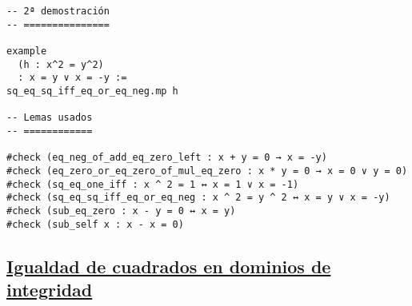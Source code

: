 \begin{verbatim}
-- 2ª demostración
-- ===============

example
  (h : x^2 = y^2)
  : x = y ∨ x = -y :=
sq_eq_sq_iff_eq_or_eq_neg.mp h

-- Lemas usados
-- ============

#check (eq_neg_of_add_eq_zero_left : x + y = 0 → x = -y)
#check (eq_zero_or_eq_zero_of_mul_eq_zero : x * y = 0 → x = 0 ∨ y = 0)
#check (sq_eq_one_iff : x ^ 2 = 1 ↔ x = 1 ∨ x = -1)
#check (sq_eq_sq_iff_eq_or_eq_neg : x ^ 2 = y ^ 2 ↔ x = y ∨ x = -y)
#check (sub_eq_zero : x - y = 0 ↔ x = y)
#check (sub_self x : x - x = 0)
\end{verbatim}

\subsection{\href{./src/Logica/Igualdad\_de\_cuadrados\_en\_dominios\_de\_integridad.lean}{Igualdad de cuadrados en dominios de integridad}}
\label{sec:org5a3a3f8}
